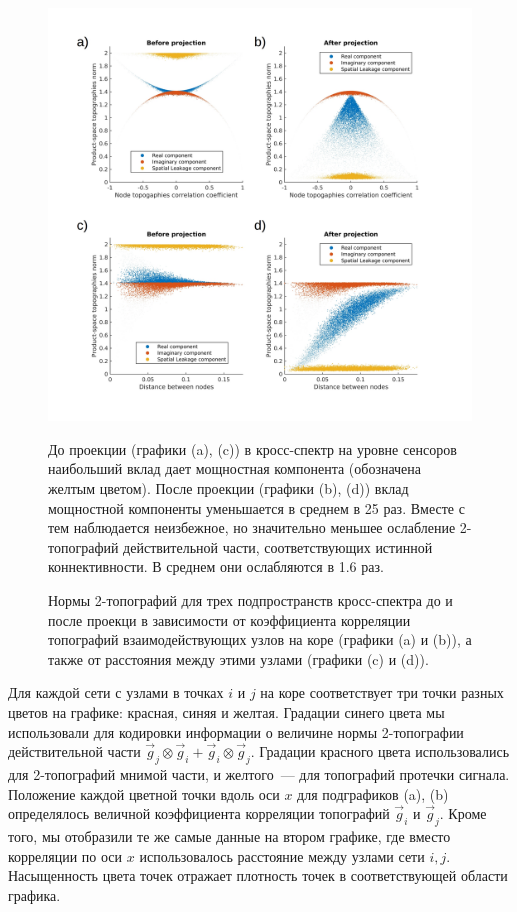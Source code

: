 \begin{figure}[!ht]
 \includegraphics[width=1\textwidth]{../images/psiicos_paper/Figure3abcd_hr}
 \caption{Нормы 2-топографий для трех подпространств кросс-спектра до и после проекци
     в зависимости от коэффициента корреляции топографий взаимодействующих
     узлов на коре (графики (a) и (b)), а также от расстояния между
     этими узлами (графики (c) и (d)).}\label{fig:02} %
     До проекции (графики (a), (c)) в кросс-спектр на уровне сенсоров наибольший вклад дает мощностная
     компонента (обозначена желтым цветом). После проекции (графики (b), (d))
     вклад мощностной компоненты уменьшается в среднем в 25 раз. Вместе с
     тем наблюдается неизбежное, но значительно меньшее ослабление
     2-топографий действительной части, соответствующих истинной коннективности.
     В среднем они ослабляются в 1.6 раз.
\end{figure}

Для каждой сети с узлами в точках $i$ и $j$ на коре соответствует три точки
разных цветов на графике: красная, синяя и желтая. Градации синего цвета мы
использовали для кодировки информации о величине нормы 2-топографии
действительной части $\vec{g}_j\otimes\vec{g}_i + \vec{g}_i\otimes\vec{g}_j$.
Градации красного цвета использовались для 2-топографий мнимой части, и
желтого~--- для топографий протечки сигнала.  Положение каждой цветной точки
вдоль оси $x$ для подграфиков (a), (b) определялось величной коэффициента
корреляции топографий $\vec{g}_i$ и $\vec{g}_j$.  Кроме того, мы отобразили те
же самые данные на втором графике, где вместо корреляции по оси $x$
использовалось расстояние между узлами сети $i, j$. Насыщенность цвета точек
отражает плотность точек в соответствующей области графика.

